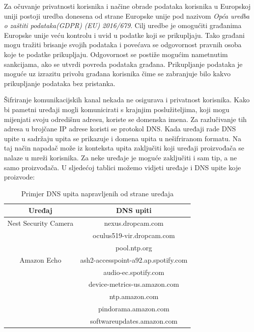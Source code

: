 \documentclass[times, utf8, diplomski]{fer}
\begin{document}
Za očuvanje privatnosti korisnika i načine obrade podataka korisnika u Europskoj uniji postoji uredba donesena od strane Europske unije pod nazivom \emph{Opća uredba o zaštiti podataka(GDPR) (EU) 2016/679}\citep{GDPR}. Cilj uredbe je omogućiti građanima Europske unije veću kontrolu i uvid u podatke koji se prikupljaju. Tako građani mogu tražiti brisanje svojih podataka i povećava se odgovornost pravnih osoba koje te podatke prikupljaju. Odgovornost se postiže mogućim nametnutim sankcijama, ako se utvrdi povreda podataka građana. Prikupljanje podataka je moguće uz izrazitu privolu građana korisnika čime se zabranjuje bilo kakvo prikupljanje podataka bez pristanka. 

Šifriranje komunikacijskih kanal nekada ne osigurava i privatnost korisnika. Kako bi pametni uređaji mogli komunicirati s krajnjim poslužiteljima, koji mogu mijenjati svoju odredišnu adresu, koriste se domenska imena. Za razlučivanje tih adresa u brojčane IP adrese koristi se protokol DNS. Kada uređaji rade DNS upite u sadržaju upita se prikazuje i domena upita u nešifriranom formatu. Na taj način napadač može iz konteksta upita zaključiti koji uređaji proizvođača se nalaze u mreži korisnika. Za neke uređaje je moguće zaključiti i sam tip, a ne samo proizvođača. U sljedećoj tablici možemo vidjeti uređaje i DNS upite koje proizvode:

\begin{table}[h]
    \centering
    \caption{Primjer DNS upita napravljenih od strane uređaja \citep{Apthorpe2017May}}
    \begin{tabular}{| c | c |} 
    \hline
    \textbf{Uređaj} & \textbf{DNS upiti} \\
    \hline\hline
    Nest Security Camera & nexus.dropcam.com \\
     & oculus519-vir.dropcam.com \\
     & pool.ntp.org \\
    \hline
    Amazon Echo & ash2-accesspoint-a92.ap.spotify.com \\ 
     & audio-ec.spotify.com \\ 
     & device-metrics-us.amazon.com \\ 
     & ntp.amazon.com \\ 
     & pindorama.amazon.com \\ 
     & softwareupdates.amazon.com \\
    \hline
    \end{tabular}
    \label{tab:confusion}
\end{table} 
\end{document}
